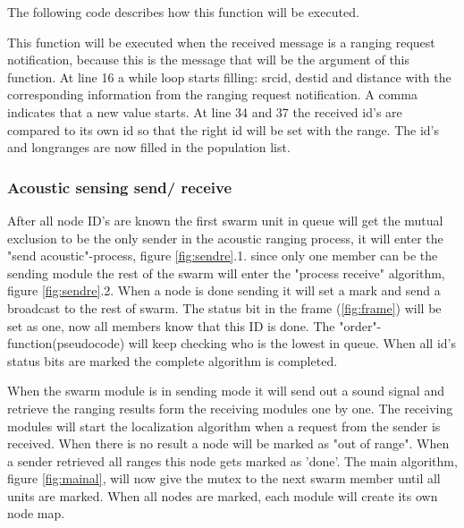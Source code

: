 \documentclass[10pt,a4paper]{article}
\begin{document}
The following code describes how this function will be executed.


This function will be executed when the received message is a ranging request notification, because this is the message that will be the argument of this function. At line 16 a while loop starts filling: srcid, destid and distance with the corresponding information from the ranging request notification. A comma indicates that a new value starts. At line 34 and 37 the received id's are compared to its own id so that the right id will be set with the range. The id's and longranges are now filled in the population list.  

\subsubsection{Acoustic sensing send/ receive}
After all node ID's are known the first swarm unit in queue will get the mutual exclusion to be the only sender in the acoustic ranging process, it will enter the "send acoustic"-process, figure \ref{fig:sendre}.1. since only one member can be the sending module the rest of the swarm will enter the "process receive" algorithm, figure \ref{fig:sendre}.2. When a node is done sending it will set a mark and send a broadcast to the rest of swarm. The status bit in the frame (\ref{fig:frame}) will be set as one, now all members know that this ID is done. The "order"-function(pseudocode) will keep checking who is the lowest in queue. When all id's status bits are marked the complete algorithm is completed.



When the swarm module is in sending mode it will send out a sound signal and retrieve the ranging results form the receiving modules one by one. The receiving modules will start the localization algorithm when a request from the sender is received. When there is no result a node will be marked as "out of range". When a sender retrieved all ranges this node gets marked as 'done'. The main algorithm, figure \ref{fig:mainal}, will now give the mutex to the next swarm member until all units are marked. When all nodes are marked, each module will create its own node map. 
\end{document}
